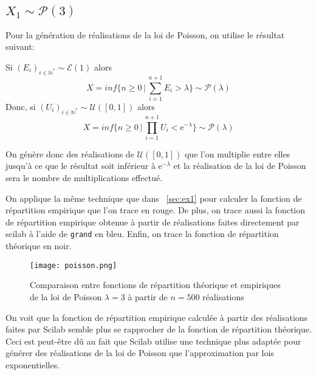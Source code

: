 \documentclass{article}
\begin{document}
\begin{multicols}{2}
\subsection{$X_1 \sim \mathcal{P}(3)$}\label{subsec:ex21}

Pour la génération de réalisations de la loi de Poisson, on utilise le résultat
suivant:

Si $(E_i)_{i \in \mathbb{N}^*} \sim \mathcal{E}(1)$ alors
\begin{equation}
    X = inf\{n \geq 0 \,|\, \sum_{i = 1}^{n + 1} E_i > \lambda\} \sim
        \mathcal{P}(\lambda)
\end{equation}
Donc, si $(U_i)_{i \in \mathbb{N}^*} \sim \mathcal{U}([0, 1])$ alors
\begin{equation}
    X = inf\{n \geq 0 \,|\, \prod_{i = 1}^{n + 1} U_i < \mathrm{e}^{-\lambda}\}
        \sim \mathcal{P}(\lambda)
\end{equation}

On génère donc des réalisations de $\mathcal{U}([0, 1])$ que l'on multiplie
entre elles jusqu'à ce que le résultat soit inférieur à $\mathrm{e}^{-\lambda}$
et la réalisation de la loi de Poisson sera le nombre de multiplications
effectué.

On applique la même technique que dans ~\ref{sec:ex1} pour calculer la fonction
de répartition empirique que l'on trace en rouge. De plus, on trace aussi la
fonction de répartition empirique obtenue à partir de réalisations faites
directement par scilab à l'aide de \texttt{grand} en bleu. Enfin, on trace la
fonction de répartition théorique en noir.

\begin{figure}[H]
    \begin{center}
        \texttt{[image: poisson.png]}
        \centering
        \captionsetup{justification=centering}
        \caption{\label{fig:poisson}Comparaison entre fonctions de répartition théorique et empiriques de la loi de Poisson $\lambda = 3$ à partir de $n = 500$ réalisations}
    \end{center}
\end{figure}

On voit que la fonction de répartition empirique calculée à partir des
réalisations faites par Scilab semble plus se rapprocher de la fonction de
répartition théorique. Ceci est peut-être dû au fait que Scilab utilise une
technique plus adaptée pour générer des réalisations de la loi de Poisson que
l'approximation par lois exponentielles.


\end{multicols}
\end{document}
